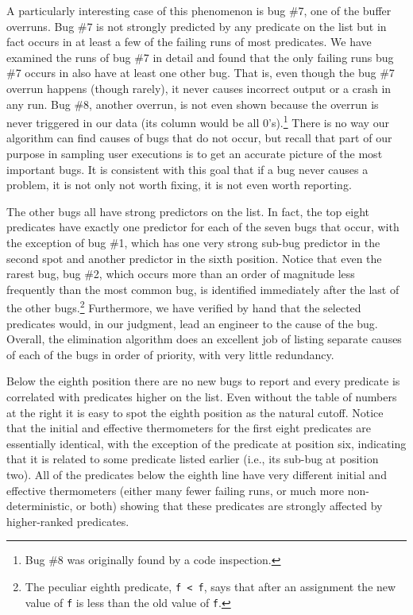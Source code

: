 A particularly interesting case of this phenomenon is bug \#7, one of
the buffer overruns.  Bug \#7 is not strongly predicted by any
predicate on the list but in fact occurs in at least a few of the
failing runs of most predicates.  We have examined the runs of bug \#7
in detail and found that the only failing runs bug \#7 occurs in also
have at least one other bug.  That is, even though the bug \#7 overrun
happens (though rarely), it never causes incorrect output or a crash
in any run.  Bug \#8, another overrun, is not even shown because the
overrun is never triggered in our data (its column would be all
0's).\footnote{Bug \#8 was originally found by a code inspection.}
There is no way our algorithm can find causes of bugs that do not
occur, but recall that part of our purpose in sampling user executions
is to get an accurate picture of the most important bugs. It is
consistent with this goal that if a bug never causes a problem, it is
not only not worth fixing, it is not even worth reporting.

The other bugs all have strong predictors on the list.  In fact,
the top eight predicates have exactly one predictor for each of the seven
bugs that occur, with the exception of bug \#1, which has one very
strong sub-bug predictor in the second spot and another predictor
in the sixth position.  Notice that even the rarest bug, bug \#2,
which occurs more than an order of magnitude less frequently than
the most common bug, is identified immediately after the last of
the other bugs.\footnote{The peculiar eighth predicate, \verb|f < f|, 
says that after an assignment the new value of {\tt f} is less than
the old value of {\tt f}.}  Furthermore, we have verified by hand that
the selected predicates would, in our judgment, lead an engineer to
the cause of the bug. Overall, the elimination algorithm does an excellent
job of listing separate causes of each of the bugs in order of priority,
with very little redundancy.

Below the eighth position there are no new bugs to report and every
predicate is correlated with predicates higher on the list.  Even
without the table of numbers at the right it is easy to spot the
eighth position as the natural cutoff.  Notice that the initial and
effective thermometers for the first eight predicates are essentially
identical, with the exception of the predicate at position six, indicating
that it is related to some predicate listed earlier (i.e., its sub-bug
at position two).  All of the predicates below the eighth line have very
different initial and effective thermometers (either many fewer
failing runs, or much more non-deterministic, or both) showing that these
predicates are strongly affected by 
higher-ranked predicates.

